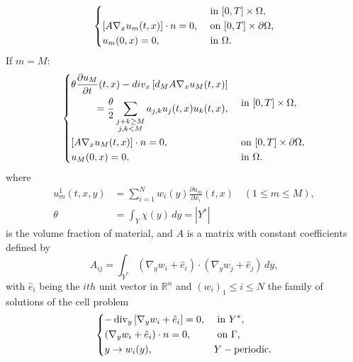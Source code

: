 \begin{theorem}
\begin{equation}
\begin{dcases}
\begin{split}
    \end{split}& \text { in }[0, T]\times\Omega,\\ 
    {\left[A \nabla_{x} u_{m}(t, x)\right] \cdot n=0}, & \text { on }[0, T]\times\partial\Omega, \\ 
    u_{m}(0, x)=0, & \text { in }\Omega.
\end{dcases}
\label{eq 17}\end{equation}
If $m=M$:
\begin{equation}
  \begin{dcases}
    \begin{split}
        \theta \frac{\partial u_{M}}{\partial t}(t, x)-d i v_{x}\left[d_{M} A \nabla_{x} u_{M}(t, x)\right] & \\ =\frac{\theta}{2} \sum_{\substack{j+k \geq M \\ j,k<M}} a_{j, k} u_{j}(t, x) u_{k}(t, x),
    \end{split} & \text { in }[0, T]\times\Omega,\\ 
    {\left[A \nabla_{x} u_{M}(t, x)\right] \cdot n=0}, & \text { on }[0, T]\times\partial\Omega, \\ 
    u_{M}(0, x)=0,& \text { in }\Omega.
\end{dcases}
\label{eq 18}\end{equation}
where
$$
\begin{aligned}
u_{m}^{1}(t, x, y) &=\sum_{i=1}^{N} w_{i}(y) \frac{\partial u_{m}}{\partial x_{i}}(t, x) \quad(1 \leq m \leq M), \\
\theta &=\int_{Y} \chi(y) \, d  y=\left|Y^{*}\right|
\end{aligned}
$$
is the volume fraction of material, and $A$ is a matrix with constant coefficients defined by
\begin{equation*}
A_{i j}=\int_{Y^{*}}\left(\nabla_{y} w_{i}+\hat{e}_{i}\right) \cdot\left(\nabla_{y} w_{j}+\hat{e}_{j}\right) \, d  y,
\end{equation*}
with  $\hat{e}_{i}$ being the $ith$ unit vector in $\mathbb{R}^n$ and $(w_i)_1\leq i \leq N$ the family of solutions of the cell problem
\begin{equation}
    \begin{dcases}
        -\operatorname{div}_{y}\left[\nabla_{y} w_{i}+\hat{e}_{i}\right]=0, & \text { in } Y^{*}, \\
        \left(\nabla_{y} w_{i}+\hat{e}_{i}\right) \cdot n=0, & \text { on } \Gamma, \\
        y \rightarrow w_{i}(y), & Y-\text {periodic}.
    \end{dcases}
    \label{eq 19}
\end{equation}
\label{thm 5.1}
\end{theorem}
